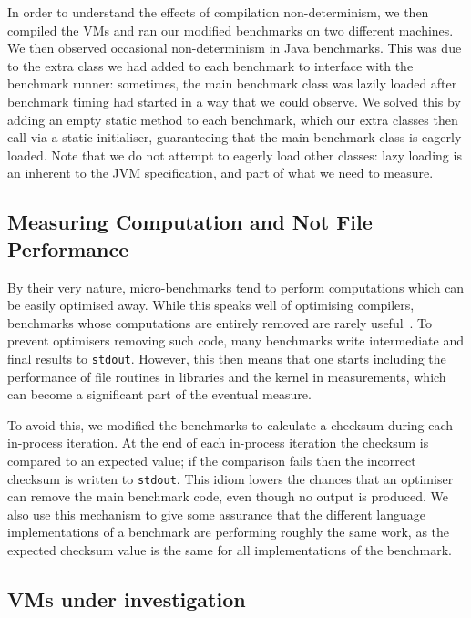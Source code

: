 \documentclass[acmlarge]{acmart}\settopmatter{printfolios=true}
\begin{document}
In order to understand the effects of compilation non-determinism,
we then compiled the VMs and ran our modified benchmarks on two different machines.
We then observed occasional non-determinism in Java benchmarks.
This was due to the extra class we had added to each benchmark
to interface with the benchmark runner: sometimes, the
main benchmark class was lazily loaded after benchmark timing had started in a
way that we could observe. We
solved this by adding an empty static method to each benchmark, which our
extra classes then call via a static initialiser, guaranteeing that
the main benchmark class is eagerly loaded. Note that we do not attempt to eagerly
load other classes: lazy loading is an inherent to the JVM specification,
and part of what we need to measure.


\subsection{Measuring Computation and Not File Performance}

By their very nature, micro-benchmarks tend to perform computations which
can be easily optimised away. While this speaks well of
optimising compilers, benchmarks whose computations
are entirely removed are rarely useful~\cite{seaton15phd}. To prevent optimisers
removing such code, many benchmarks write intermediate and final results
to \texttt{stdout}. However, this then means that one starts including
the performance of file routines in libraries and the kernel in measurements,
which can become a significant part of the eventual measure.

To avoid this, we modified the benchmarks to calculate a checksum
during each in-process iteration. At the end of each in-process iteration
the checksum is compared to an expected value; if the comparison fails then
the incorrect checksum is written to \texttt{stdout}. This idiom
lowers the chances that an optimiser can remove the main benchmark
code, even though no output is produced. We also use this mechanism to give some assurance
that the different language implementations of a benchmark are performing
roughly the same work, as the expected checksum value is the same for all
implementations of the benchmark.


\subsection{VMs under investigation}
\label{sec:vms}
\end{document}
